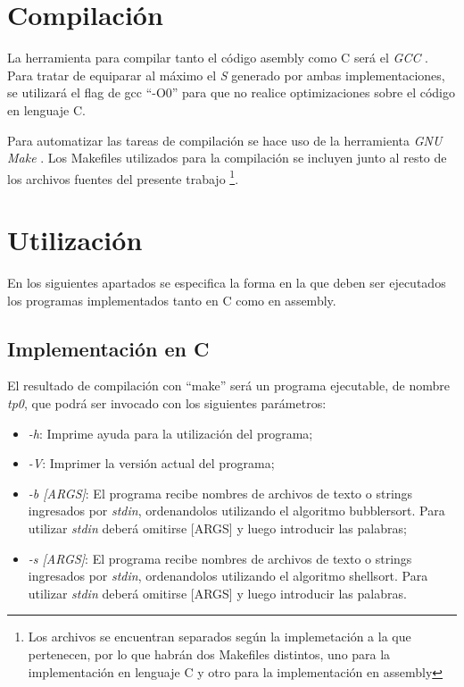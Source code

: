 \documentclass{article}
\begin{document}
\section{Compilación}
	
	La herramienta para compilar tanto el código asembly como C será el \textit{GCC} \cite{GCC}. Para tratar de equiparar al máximo el \textit{S} generado por ambas implementaciones, se utilizará el flag de gcc ``-O0'' para que no realice optimizaciones sobre el código en lenguaje C.
	\par
	Para automatizar las tareas de compilación se hace uso de la herramienta \textit{GNU Make} . Los Makefiles utilizados para la compilación se incluyen junto al resto de los archivos fuentes del presente trabajo \footnote{Los archivos se encuentran separados según la implemetación a la que pertenecen, por lo que habrán dos Makefiles distintos, uno para la implementación en lenguaje C y otro para la implementación en assembly}.
\bigskip




\section{Utilización}
	
	En los siguientes apartados se especifica la forma en la que deben ser ejecutados los programas implementados tanto en C como en assembly.
\medskip


\subsection{Implementación en C}

	El resultado de compilación con ``make'' será un programa ejecutable, de nombre \textit{tp0}, que podrá ser invocado con los siguientes parámetros:
\medskip

\begin{itemize}

\itemsep=2pt \topsep=0pt \partopsep=0pt \parskip=0pt \parsep=0pt
	\item \textit{-h}:  Imprime ayuda para la utilización del programa;
	\item \textit{-V}:  Imprimer la versión actual del programa;
	\item \textit{-b [ARGS]}:  El programa recibe nombres de archivos de texto o strings ingresados por \textit{stdin}, ordenandolos utilizando el algoritmo bubblersort. Para utilizar \textit{stdin} deberá omitirse [ARGS] y luego introducir las palabras;
	\item \textit{-s [ARGS]}:  El programa recibe nombres de archivos de texto o strings ingresados por \textit{stdin}, ordenandolos utilizando el algoritmo shellsort. Para utilizar \textit{stdin} deberá omitirse [ARGS] y luego introducir las palabras.

\end{itemize}	
\medskip
\end{document}
